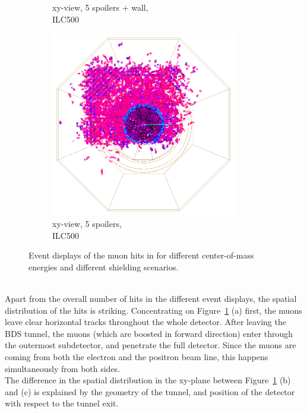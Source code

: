 \begin{figure}[htbp]
\begin{subfigure}[b]{0.31\textwidth}
   \caption{xy-view, 5 spoilers + wall,\\ILC500}
   \end{subfigure}
   \hfill
    \begin{subfigure}[b]{0.31\textwidth}
   \centering
    \includegraphics[width=0.9\textwidth]{Figures/BDS_muons/muons_positron_5spoilers_2961_xyview_croped_inverted.png}
   \caption{xy-view, 5 spoilers,\\ILC500}
   \end{subfigure}
   \caption[Event displays of BDS muons in \sid]{Event displays of the muon hits in \sid for different center-of-mass energies and different shielding scenarios.}
   \label{fig:BDS_Muons:wired4}
 \end{figure}
\\Apart from the overall number of hits in the different event displays, the spatial distribution of the hits is striking.
Concentrating on Figure~\ref{fig:BDS_Muons:wired4} (a) first, the muons leave clear horizontal tracks throughout the whole detector.
After leaving the BDS tunnel, the muons (which are boosted in forward direction) enter \sid through the outermost subdetector, and penetrate the full detector.
Since the muons are coming from both the electron and the positron beam line, this happens simultaneously from both sides.
\\The difference in the spatial distribution in the xy-plane between Figure~\ref{fig:BDS_Muons:wired4} (b) and (c) is explained by the geometry of the tunnel, and position of the detector with respect to the tunnel exit.
